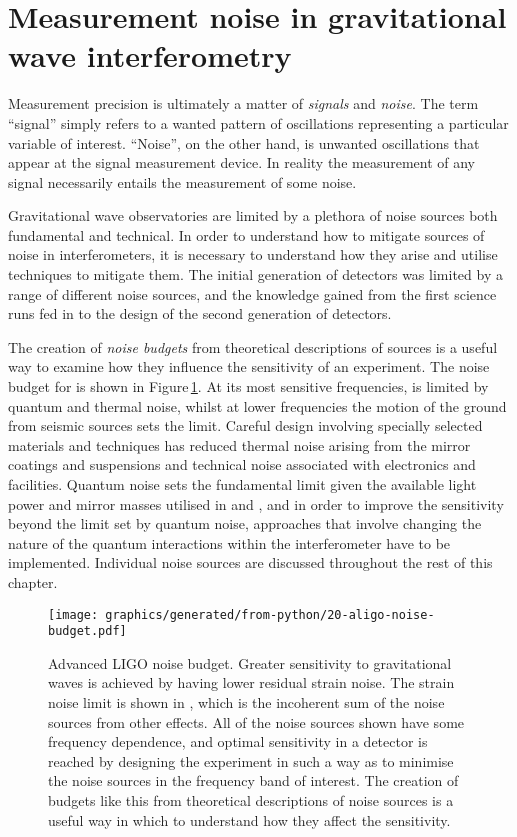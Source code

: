 \section{\label{sec:ifo-noise}Measurement noise in gravitational wave interferometry}
Measurement precision is ultimately a matter of \emph{signals} and \emph{noise}. The term ``signal'' simply refers to a wanted pattern of oscillations representing a particular variable of interest. ``Noise'', on the other hand, is unwanted oscillations that appear at the signal measurement device. In reality the measurement of any signal necessarily entails the measurement of some noise.

Gravitational wave observatories are limited by a plethora of noise sources both fundamental and technical. In order to understand how to mitigate sources of noise in interferometers, it is necessary to understand how they arise and utilise techniques to mitigate them. The initial generation of detectors was limited by a range of different noise sources, and the knowledge gained from the first science runs fed in to the design of the second generation of detectors.

The creation of \emph{noise budgets} from theoretical descriptions of sources is a useful way to examine how they influence the sensitivity of an experiment. The noise budget for \ALIGO{} is shown in Figure\,\ref{fig:aligo-noise-budget}. At its most sensitive frequencies, \ALIGO{} is limited by quantum and thermal noise, whilst at lower frequencies the motion of the ground from seismic sources sets the limit. Careful design involving specially selected materials and techniques has reduced thermal noise arising from the mirror coatings and suspensions and technical noise associated with electronics and facilities. Quantum noise sets the fundamental limit given the available light power and mirror masses utilised in \ALIGO{} and \AVIRGO{}, and in order to improve the sensitivity beyond the limit set by quantum noise, approaches that involve changing the nature of the quantum interactions within the interferometer have to be implemented. Individual noise sources are discussed throughout the rest of this chapter.

\begin{figure}
  \centering
  \texttt{[image: graphics/generated/from-python/20-aligo-noise-budget.pdf]}
  \caption[Advanced LIGO noise budget]{\label{fig:aligo-noise-budget}Advanced LIGO noise budget. Greater sensitivity to gravitational waves is achieved by having lower residual strain noise. The strain noise limit is shown in , which is the incoherent sum of the noise sources from other effects. All of the noise sources shown have some frequency dependence, and optimal sensitivity in a detector is reached by designing the experiment in such a way as to minimise the noise sources in the frequency band of interest. The creation of budgets like this from theoretical descriptions of noise sources is a useful way in which to understand how they affect the sensitivity.}
\end{figure}

